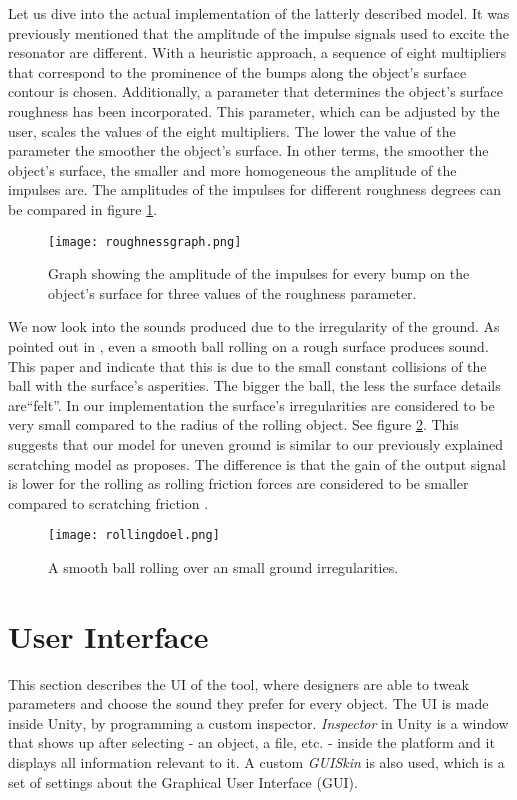 Let us dive into the actual implementation of the latterly described model. It was previously mentioned that the amplitude of the impulse signals used to excite the resonator are different. With a heuristic approach, a sequence of eight multipliers that correspond to the prominence of the bumps along the object's surface contour is chosen. Additionally, a parameter that determines the object's surface roughness has been incorporated. This parameter, which can be adjusted by the user, scales the values of the eight multipliers. The lower the value of the parameter the smoother the object's surface. In other terms, the smoother the object's surface, the smaller and more homogeneous the amplitude of the impulses are. The amplitudes of the impulses for different roughness degrees can be compared in figure  \ref{fig:roughnessgraph}.

\begin{figure}[H]
  \centering
    \texttt{[image: roughnessgraph.png]}
      \caption{Graph showing the amplitude of the impulses for every bump on the object's surface for three values of the roughness parameter.}
      \label{fig:roughnessgraph}
\end{figure} 

We now look into the sounds produced due to the irregularity of the ground. As pointed out in \cite{van2001foleyautomatic}, even a smooth ball rolling on a rough surface produces sound. This paper and \cite{rath2003expressive} indicate that this is due to the small constant collisions of the ball with the surface's asperities. The bigger the ball, the less the surface details are``felt''. In our implementation the surface's irregularities are considered to be very small compared to the radius of the rolling object. See figure \ref{fig:rollingdoel}. This suggests that our model for uneven ground is similar to our previously explained scratching model as \cite{van2001foleyautomatic} proposes. The difference is that the gain of the output signal is lower for the rolling as rolling friction forces are considered to be smaller compared to scratching friction \cite{mehtas}.

\begin{figure}[H]
  \centering
    \texttt{[image: rollingdoel.png]}
      \caption{A smooth ball rolling over an small ground irregularities.}
      \label{fig:rollingdoel}
\end{figure} 



\section{User Interface}\label{sec:UI}
This section describes the \gls{UI} of the tool, where designers are able to tweak parameters and choose the sound they prefer for every object. The \gls{UI} is made inside Unity\textsuperscript{\textregistered}, by programming a custom inspector. \textit{Inspector} in Unity\textsuperscript{\textregistered} is a window that shows up after selecting - an object, a file, etc. - inside the platform and it displays all information relevant to it. A custom \textit{GUISkin} is also used, which is a set of settings about the Graphical User Interface (GUI). 

